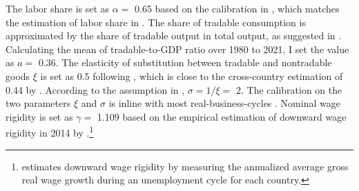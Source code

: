 The labor share is set as $\alpha=$ 0.65 based on the calibration in \citet*{Jegajeevan-Sri-Lanka-DSGE}, which matches the estimation of labor share in \citet{duma2007sri}. The share of tradable consumption is approximated by the share of tradable output in total output, as suggested in \citet{Uribe-Schmitt-Grohe-textbook}. Calculating the mean of tradable-to-GDP ratio over 1980 to 2021, I set the value as $a =$ 0.36. The elasticity of substitution between tradable and nontradable goods $\xi$ is set as 0.5 following \citet{Uribe-Schmitt-Grohe-textbook}, which is close to the cross-country estimation of 0.44 by \citet*{Stockman-Tesar-95}. According to the assumption in , $\sigma=1/\xi=$ 2. The calibration on the two parameters $\xi$ and $\sigma$ is inline with most real-business-cycles \citep{Uribe-Schmitt-Grohe-textbook,Na-18}. Nominal wage rigidity is set as $\gamma=$ 1.109 based on the empirical estimation of downward wage rigidity in 2014 by \citet*{wage-rigidity-data}.\footnote{
    \citet{wage-rigidity-data} estimates downward wage rigidity by measuring the annualized average gross real wage growth during an unemployment cycle for each country.
    }

